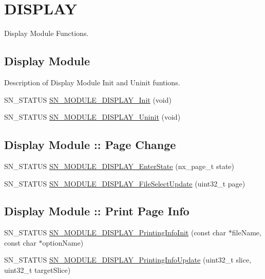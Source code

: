 \hypertarget{group__DISPLAY}{}\section{D\+I\+S\+P\+L\+AY}
\label{group__DISPLAY}


Display Module Functions.  


\subsection*{Display Module}
\label{_amgrp9bc8c99c649c6c3f474df9cfdebdef93}%
Description of Display Module Init and Uninit funtions. \begin{DoxyCompactItemize}
\item 
S\+N\+\_\+\+S\+T\+A\+T\+US \hyperlink{group__DISPLAY_ga894da8d8618a3c3b5bf2533a3a04622c}{S\+N\+\_\+\+M\+O\+D\+U\+L\+E\+\_\+\+D\+I\+S\+P\+L\+A\+Y\+\_\+\+Init} (void)
\item 
S\+N\+\_\+\+S\+T\+A\+T\+US \hyperlink{group__DISPLAY_ga91f86811b5f4b83be3296c64ccd253ec}{S\+N\+\_\+\+M\+O\+D\+U\+L\+E\+\_\+\+D\+I\+S\+P\+L\+A\+Y\+\_\+\+Uninit} (void)
\end{DoxyCompactItemize}
\subsection*{Display Module \+:\+: Page Change}
\begin{DoxyCompactItemize}
\item 
S\+N\+\_\+\+S\+T\+A\+T\+US \hyperlink{group__DISPLAY_ga91ef90fbda58e050514b22a2a564a82d}{S\+N\+\_\+\+M\+O\+D\+U\+L\+E\+\_\+\+D\+I\+S\+P\+L\+A\+Y\+\_\+\+Enter\+State} (nx\+\_\+page\+\_\+t state)
\item 
S\+N\+\_\+\+S\+T\+A\+T\+US \hyperlink{group__DISPLAY_gabbde75c3e1a0fe4ffc14492a4e42931b}{S\+N\+\_\+\+M\+O\+D\+U\+L\+E\+\_\+\+D\+I\+S\+P\+L\+A\+Y\+\_\+\+File\+Select\+Update} (uint32\+\_\+t page)
\end{DoxyCompactItemize}
\subsection*{Display Module \+:\+: Print Page Info}
\begin{DoxyCompactItemize}
\item 
S\+N\+\_\+\+S\+T\+A\+T\+US \hyperlink{group__DISPLAY_ga6059a98606c93e2bd4bd2ffb68486e4c}{S\+N\+\_\+\+M\+O\+D\+U\+L\+E\+\_\+\+D\+I\+S\+P\+L\+A\+Y\+\_\+\+Printing\+Info\+Init} (const char $\ast$file\+Name, const char $\ast$option\+Name)
\item 
S\+N\+\_\+\+S\+T\+A\+T\+US \hyperlink{group__DISPLAY_ga943b965a7a2e59a6c9f035c74c2c8735}{S\+N\+\_\+\+M\+O\+D\+U\+L\+E\+\_\+\+D\+I\+S\+P\+L\+A\+Y\+\_\+\+Printing\+Info\+Update} (uint32\+\_\+t slice, uint32\+\_\+t target\+Slice)
\end{DoxyCompactItemize}
